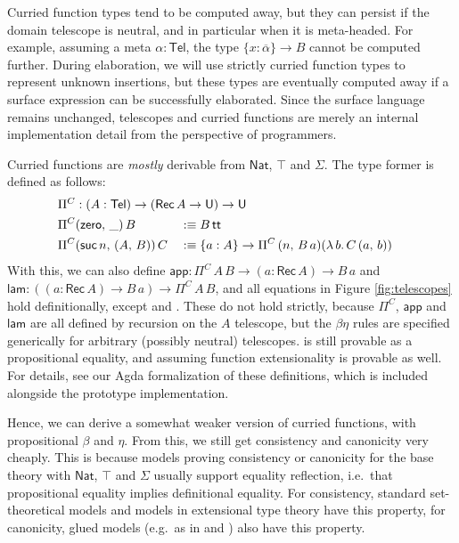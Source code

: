 \documentclass[acmsmall,review,anonymous,prologue,dvipsnames]{acmart}\settopmatter{printfolios=true,printccs=false,printacmref=false}
\renewcommand{\U}{\mathsf{U}}
\renewcommand{\tt}{\mathsf{tt}}
\newcommand{\Nat}{\mathsf{Nat}}
\newcommand{\zero}{\mathsf{zero}}
\newcommand{\suc}{\mathsf{suc}}
\newcommand{\Tel}{\mathsf{Tel}}
\newcommand{\Rec}{\mathsf{Rec}}
\newcommand{\ol}[1]{\overline{#1}}
\theoremstyle{remark}
\begin{document}
Curried function types tend to be computed away, but they can persist if the
domain telescope is neutral, and in particular when it is meta-headed. For
example, assuming a meta $\alpha : \Tel$, the type $\{x : \ol{\alpha}\}\to B$
cannot be computed further. During elaboration, we will use strictly curried
function types to represent unknown insertions, but these types are eventually
computed away if a surface expression can be successfully elaborated. Since the
surface language remains unchanged, telescopes and curried functions are merely
an internal implementation detail from the perspective of programmers.

Curried functions are \emph{mostly} derivable from $\Nat$, $\top$ and $\Sigma$.
The type former is defined as follows:
\begin{alignat*}{3}
& \rlap{$\Pi^C : (A : \Tel) \to (\Rec\,A \to \U) \to \U$}\\
& \Pi^C (\zero,\,\_)\,B && :\equiv B\,\tt\\
& \Pi^C (\suc\,n,\,(A,\,B))\,C && :\equiv \{a : A\}\to \Pi^C\,(n,\,B\,a) (\lambda\,b.\,C\,(a,\,b))
\end{alignat*}
With this, we can also define $\mathsf{app} : \Pi^C\,A\,B \to (a : \Rec\,A) \to
B\, a$ and $\mathsf{lam} : ((a : \Rec\,A) \to B\, a) \to \Pi^C\,A\,B$, and all
equations in Figure \ref{fig:telescopes} hold definitionally, except
 and . These do not hold
strictly, because $\Pi^C$, $\mathsf{app}$ and $\mathsf{lam}$ are all defined by
recursion on the $A$ telescope, but the $\beta\eta$ rules are specified
generically for arbitrary (possibly neutral)
telescopes.  is still provable as a propositional
equality, and assuming function extensionality  is
provable as well. For details, see our Agda formalization of these definitions,
which is included alongside the prototype implementation.

Hence, we can derive a somewhat weaker version of curried functions, with
propositional $\beta$ and $\eta$. From this, we still get consistency and
canonicity very cheaply. This is because models proving consistency or
canonicity for the base theory with $\Nat$, $\top$ and $\Sigma$ usually support
equality reflection, i.e.\ that propositional equality implies definitional
equality. For consistency, standard set-theoretical models and models in
extensional type theory have this property, for canonicity, glued models
(e.g.\ as in \cite{kaposi2019gluing} and \cite{sterling2019algebraic}) also have
this property.
\end{document}
